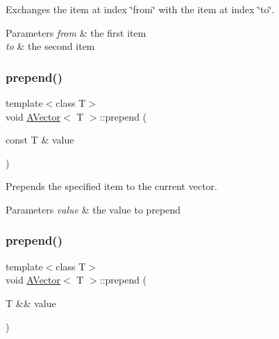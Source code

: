 Exchanges the item at index \char`\"{}from\char`\"{} with the item at index \char`\"{}to\char`\"{}. 


\begin{DoxyParams}{Parameters}
{\em from} & the first item \\
\hline
{\em to} & the second item \\
\hline
\end{DoxyParams}
\mbox{\label{class_a_vector_a5b7910c1c1dce6877a21f9c5cba4bfc2}} 
\subsubsection{\texorpdfstring{prepend()}{prepend()}\hspace{0.1cm}{\footnotesize\ttfamily [1/2]}}
{\footnotesize\ttfamily template$<$class T$>$ \\
void \mbox{\hyperlink{class_a_vector}{A\+Vector}}$<$ T $>$\+::prepend (\begin{DoxyParamCaption}\item[{const T \&}]{value }\end{DoxyParamCaption})}



Prepends the specified item to the current vector. 


\begin{DoxyParams}{Parameters}
{\em value} & the value to prepend \\
\hline
\end{DoxyParams}
\mbox{\label{class_a_vector_a13f40bde5b40222d98fe0982eaca9513}} 
\subsubsection{\texorpdfstring{prepend()}{prepend()}\hspace{0.1cm}{\footnotesize\ttfamily [2/2]}}
{\footnotesize\ttfamily template$<$class T$>$ \\
void \mbox{\hyperlink{class_a_vector}{A\+Vector}}$<$ T $>$\+::prepend (\begin{DoxyParamCaption}\item[{T \&\&}]{value }\end{DoxyParamCaption})}



